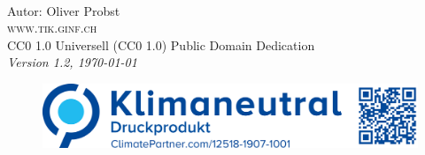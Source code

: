 \newpage
~\vfill
\thispagestyle{empty}

\noindent Autor: Oliver Probst\\

\noindent \textsc{www.tik.ginf.ch}\\

\noindent \ccLogo \hspace{0.1cm} \ccZero \hspace{0.1cm} CC0 1.0 Universell (CC0 1.0) Public Domain Dedication \\

\noindent \textit{Version 1.2, \today}

\begin{figure}[htb]
\includegraphics[scale=0.15]{climate}
\end{figure}

